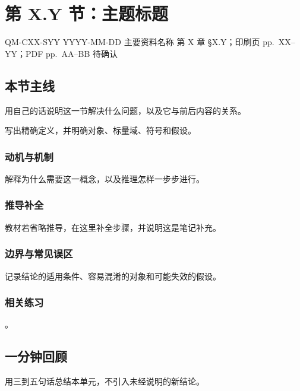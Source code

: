 
\section{第 X.Y 节：主题标题}
\label{section:QM-CXX-SYY}

\studymeta
  {QM-CXX-SYY}
  {YYYY-MM-DD}
  {主要资料名称}
  {第 X 章 \S X.Y；印刷页 pp.~XX--YY；PDF pp.~AA--BB}
  {待确认}

\subsection{本节主线}

用自己的话说明这一节解决什么问题，以及它与前后内容的关系。



\begin{definition}
写出精确定义，并明确对象、标量域、符号和假设。
\end{definition}

\subsubsection{动机与机制}

解释为什么需要这一概念，以及推理怎样一步步进行。

\subsubsection{推导补全}

教材若省略推导，在这里补全步骤，并说明这是笔记补充。

\subsubsection{边界与常见误区}

记录结论的适用条件、容易混淆的对象和可能失效的假设。

\subsubsection{相关练习}

。

\subsection{一分钟回顾}

用三到五句话总结本单元，不引入未经说明的新结论。
